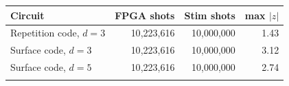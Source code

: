 \begin{tabular}{@{}lrrr@{}}
\toprule
Circuit & FPGA shots & Stim shots & max $|z|$ \\
\midrule
Repetition code, $d=3$ & 10{,}223{,}616 & 10{,}000{,}000 & 1.43 \\
Surface code, $d=3$ & 10{,}223{,}616 & 10{,}000{,}000 & 3.12 \\
Surface code, $d=5$ & 10{,}223{,}616 & 10{,}000{,}000 & 2.74 \\
\botrule
\end{tabular}
